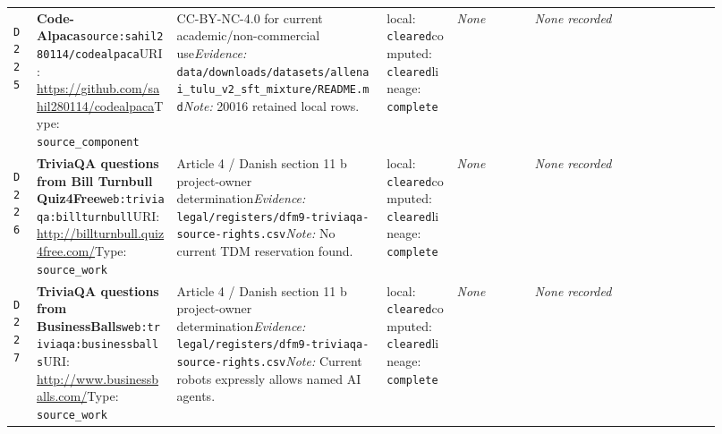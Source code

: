 \documentclass[9pt,a4paper]{article}
\newcommand{\depid}[1]{\hypertarget{dep:#1}{\texttt{#1}}}
\begin{document}
\begin{landscape}
\begin{longtable}{@{}L{0.035\linewidth}L{0.185\linewidth}L{0.27\linewidth}L{0.09\linewidth}L{0.10\linewidth}L{0.24\linewidth}@{}}
\depid{D225} & \textbf{Code-Alpaca}\newline \nolinkurl{source:sahil280114/codealpaca}\newline URI: \url{https://github.com/sahil280114/codealpaca}\newline Type: \texttt{source\_component} & CC-BY-NC-4.0 for current academic/non-commercial use\newline \textit{Evidence:} \nolinkurl{data/downloads/datasets/allenai_tulu_v2_sft_mixture/README.md}\newline \textit{Note:} 20016 retained local rows. & local: \texttt{cleared}\newline computed: \texttt{cleared}\newline lineage: \texttt{complete} & \textit{None} & \textit{None recorded} \\
\depid{D226} & \textbf{TriviaQA questions from Bill Turnbull Quiz4Free}\newline \nolinkurl{web:triviaqa:billturnbull}\newline URI: \url{http://billturnbull.quiz4free.com/}\newline Type: \texttt{source\_work} & Article 4 / Danish section 11 b project-owner determination\newline \textit{Evidence:} \nolinkurl{legal/registers/dfm9-triviaqa-source-rights.csv}\newline \textit{Note:} No current TDM reservation found. & local: \texttt{cleared}\newline computed: \texttt{cleared}\newline lineage: \texttt{complete} & \textit{None} & \textit{None recorded} \\
\depid{D227} & \textbf{TriviaQA questions from BusinessBalls}\newline \nolinkurl{web:triviaqa:businessballs}\newline URI: \url{http://www.businessballs.com/}\newline Type: \texttt{source\_work} & Article 4 / Danish section 11 b project-owner determination\newline \textit{Evidence:} \nolinkurl{legal/registers/dfm9-triviaqa-source-rights.csv}\newline \textit{Note:} Current robots expressly allows named AI agents. & local: \texttt{cleared}\newline computed: \texttt{cleared}\newline lineage: \texttt{complete} & \textit{None} & \textit{None recorded} \\

\end{longtable}
\end{landscape}
\end{document}

